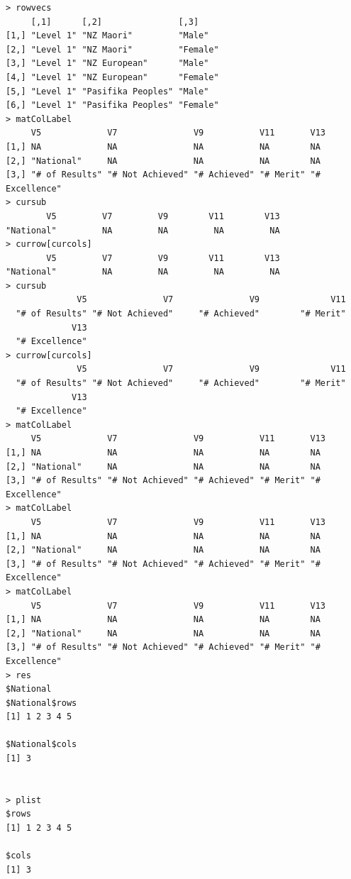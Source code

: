 \documentclass[a4paper]{article}
\begin{document}
\begin{verbatim}
> rowvecs 
     [,1]      [,2]               [,3]    
[1,] "Level 1" "NZ Maori"         "Male"  
[2,] "Level 1" "NZ Maori"         "Female"
[3,] "Level 1" "NZ European"      "Male"  
[4,] "Level 1" "NZ European"      "Female"
[5,] "Level 1" "Pasifika Peoples" "Male"  
[6,] "Level 1" "Pasifika Peoples" "Female"
> matColLabel 
     V5             V7               V9           V11       V13           
[1,] NA             NA               NA           NA        NA            
[2,] "National"     NA               NA           NA        NA            
[3,] "# of Results" "# Not Achieved" "# Achieved" "# Merit" "# Excellence"
> cursub 
        V5         V7         V9        V11        V13 
"National"         NA         NA         NA         NA 
> currow[curcols] 
        V5         V7         V9        V11        V13 
"National"         NA         NA         NA         NA 
> cursub 
              V5               V7               V9              V11 
  "# of Results" "# Not Achieved"     "# Achieved"        "# Merit" 
             V13 
  "# Excellence" 
> currow[curcols] 
              V5               V7               V9              V11 
  "# of Results" "# Not Achieved"     "# Achieved"        "# Merit" 
             V13 
  "# Excellence" 
> matColLabel 
     V5             V7               V9           V11       V13           
[1,] NA             NA               NA           NA        NA            
[2,] "National"     NA               NA           NA        NA            
[3,] "# of Results" "# Not Achieved" "# Achieved" "# Merit" "# Excellence"
> matColLabel 
     V5             V7               V9           V11       V13           
[1,] NA             NA               NA           NA        NA            
[2,] "National"     NA               NA           NA        NA            
[3,] "# of Results" "# Not Achieved" "# Achieved" "# Merit" "# Excellence"
> matColLabel 
     V5             V7               V9           V11       V13           
[1,] NA             NA               NA           NA        NA            
[2,] "National"     NA               NA           NA        NA            
[3,] "# of Results" "# Not Achieved" "# Achieved" "# Merit" "# Excellence"
> res 
$National
$National$rows
[1] 1 2 3 4 5

$National$cols
[1] 3


> plist 
$rows
[1] 1 2 3 4 5

$cols
[1] 3


\end{verbatim}
\end{document}
